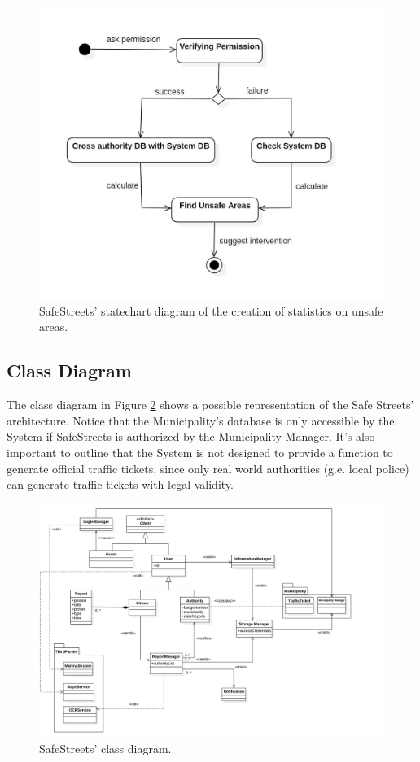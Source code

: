 \documentclass{report}
\begin{document}
\begin{figure}[!ht]
\begin{center}
\includegraphics[width=.8\textwidth]{./img/img_UnsafeAreas.jpg}
\end{center}
\caption{SafeStreets' statechart diagram of the creation of statistics on unsafe areas.}
\label{fig:State2}
\end{figure}
\newpage
\subsection{Class Diagram}
The class diagram in Figure \ref{fig:UML} shows a possible representation of the Safe Streets' architecture. Notice that the Municipality's database is only accessible by the System if SafeStreets is authorized by the Municipality Manager. It's also important to outline that the System is not designed to provide a function to generate official traffic tickets, since only real world authorities (g.e. local police) can generate traffic tickets with legal validity.
\begin{figure}[!ht]
\begin{center}
\includegraphics[width=\textwidth]{./img/SWE1.png}
\end{center}
\caption{SafeStreets' class diagram.}
\label{fig:UML}
\end{figure} 
\newpage
\end{document}
